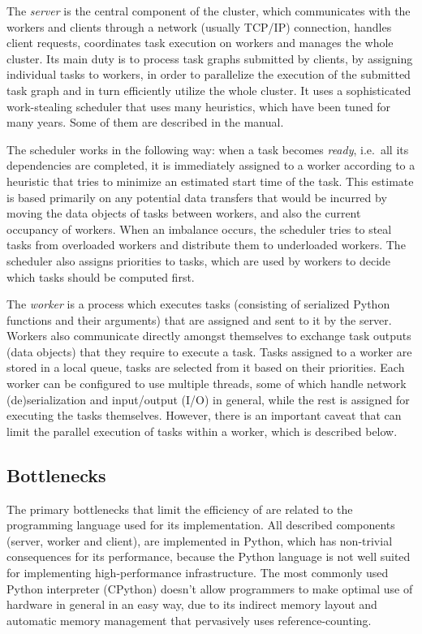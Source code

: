 The \emph{server} is the central component of the cluster, which communicates with the
workers and clients through a network (usually TCP/IP) connection, handles client requests,
coordinates task execution on workers and manages the whole \dask{} cluster. Its
main duty is to process task graphs submitted by clients, by assigning individual tasks to workers,
in order to parallelize the execution of the submitted task graph and in turn efficiently utilize
the whole cluster. It uses a sophisticated work-stealing scheduler that uses many heuristics, which
have been tuned for many years. Some of them are described in the \dask{}
manual.

The scheduler works in the following way: when a task becomes \emph{ready}, i.e.\ all
its dependencies are completed, it is immediately assigned to a worker according to a heuristic
that tries to minimize an estimated start time of the task. This estimate is based primarily on any
potential data transfers that would be incurred by moving the data objects of tasks between
workers, and also the current occupancy of workers. When an imbalance occurs, the scheduler tries
to steal tasks from overloaded workers and distribute them to underloaded workers. The scheduler
also assigns priorities to tasks, which are used by workers to decide which tasks should be
computed first.

The \emph{worker} is a process which executes tasks (consisting of serialized Python
functions and their arguments) that are assigned and sent to it by the server. Workers also
communicate directly amongst themselves to exchange task outputs (data objects) that they require
to execute a task. Tasks assigned to a worker are stored in a local queue, tasks are selected from
it based on their priorities. Each worker can be configured to use multiple threads, some of which
handle network (de)serialization and input/output (I/O) in general, while the rest is assigned for
executing the tasks themselves. However, there is an important caveat that can limit the parallel
execution of tasks within a worker, which is described below.

\subsection*{Bottlenecks}
The primary bottlenecks that limit the efficiency of \dask{} are related to the
programming language used for its implementation. All described components (server, worker and
client), are implemented in Python, which has non-trivial consequences for its performance, because
the Python language is not well suited for implementing high-performance infrastructure. The most
commonly used Python interpreter (CPython) doesn't allow programmers to make
optimal use of hardware in general in an easy way, due to its indirect memory layout and automatic
memory management that pervasively uses reference-counting.

